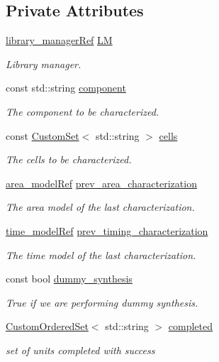 \subsection*{Private Attributes}
\begin{DoxyCompactItemize}
\item 
\hyperlink{library__manager_8hpp_aacc6d633b0aa80ecfeb1180fd480ae68}{library\+\_\+manager\+Ref} \hyperlink{classRTLCharacterization_a19d1e3b24588c8c02cbf3270d9937d1b}{LM}
\begin{DoxyCompactList}\small\item\em Library manager. \end{DoxyCompactList}\item 
const std\+::string \hyperlink{classRTLCharacterization_a81db435891a407a40bdf46b77d6032e3}{component}
\begin{DoxyCompactList}\small\item\em The component to be characterized. \end{DoxyCompactList}\item 
const \hyperlink{custom__set_8hpp_a615bc2f42fc38a4bb1790d12c759e86f}{Custom\+Set}$<$ std\+::string $>$ \hyperlink{classRTLCharacterization_afbefdea47835573280c058eafb3453cb}{cells}
\begin{DoxyCompactList}\small\item\em The cells to be characterized. \end{DoxyCompactList}\item 
\hyperlink{area__model_8hpp_aec11e4e9b1b3afd49a437cb37df0abfb}{area\+\_\+model\+Ref} \hyperlink{classRTLCharacterization_a37173cc4c3dcf672588dd119de85e81c}{prev\+\_\+area\+\_\+characterization}
\begin{DoxyCompactList}\small\item\em The area model of the last characterization. \end{DoxyCompactList}\item 
\hyperlink{time__model_8hpp_ae203bb7faf1c278333f76fcc6ebe412c}{time\+\_\+model\+Ref} \hyperlink{classRTLCharacterization_a10951c85f4371dfd1133436377772bd3}{prev\+\_\+timing\+\_\+characterization}
\begin{DoxyCompactList}\small\item\em The time model of the last characterization. \end{DoxyCompactList}\item 
const bool \hyperlink{classRTLCharacterization_a0490f2369c8d0e8399cda8d44059f143}{dummy\+\_\+synthesis}
\begin{DoxyCompactList}\small\item\em True if we are performing dummy synthesis. \end{DoxyCompactList}\item 
\hyperlink{classCustomOrderedSet}{Custom\+Ordered\+Set}$<$ std\+::string $>$ \hyperlink{classRTLCharacterization_abf51e514c27628da4ef919dfb0ce00c8}{completed}
\begin{DoxyCompactList}\small\item\em set of units completed with success \end{DoxyCompactList}\end{DoxyCompactItemize}
